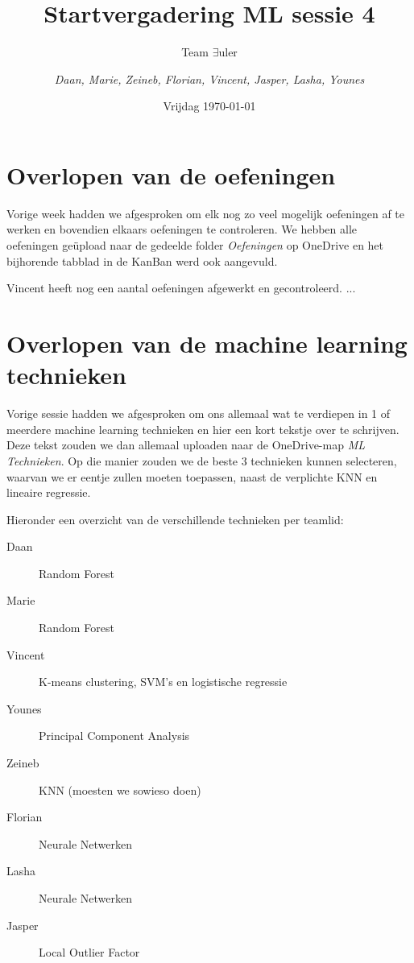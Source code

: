 \documentclass{article}
\title{Startvergadering ML sessie 4}
\author{Team $\exists$uler \and
	\textit{Daan, Marie, Zeineb, Florian, Vincent, Jasper, Lasha, Younes}}
\date{Vrijdag \today}
\begin{document}
	
	\maketitle
	
	\section*{Overlopen van de oefeningen}
	
	Vorige week hadden we afgesproken om elk nog zo veel mogelijk oefeningen af te werken en bovendien elkaars oefeningen te controleren. We hebben alle oefeningen geüpload naar de gedeelde folder \textit{Oefeningen} op OneDrive en het bijhorende tabblad in de KanBan werd ook aangevuld.
	
	Vincent heeft nog een aantal oefeningen afgewerkt en gecontroleerd. ...
	
	\section*{Overlopen van de machine learning technieken}
	
	Vorige sessie hadden we afgesproken om ons allemaal wat te verdiepen in 1 of meerdere machine learning technieken en hier een kort tekstje over te schrijven. Deze tekst zouden we dan allemaal uploaden naar de OneDrive-map \textit{ML Technieken}. Op die manier zouden we de beste 3 technieken kunnen selecteren, waarvan we er eentje zullen moeten toepassen, naast de verplichte KNN en lineaire regressie.
	
	Hieronder een overzicht van de verschillende technieken per teamlid:
	
	\begin{description}
		\item[Daan] Random Forest
		\item[Marie] Random Forest
		\item[Vincent] K-means clustering, SVM's en logistische regressie
		\item[Younes] Principal Component Analysis
		\item[Zeineb] KNN (moesten we sowieso doen)
		\item[Florian] Neurale Netwerken
		\item[Lasha] Neurale Netwerken
		\item[Jasper] Local Outlier Factor
	\end{description}	
	
\end{document}
